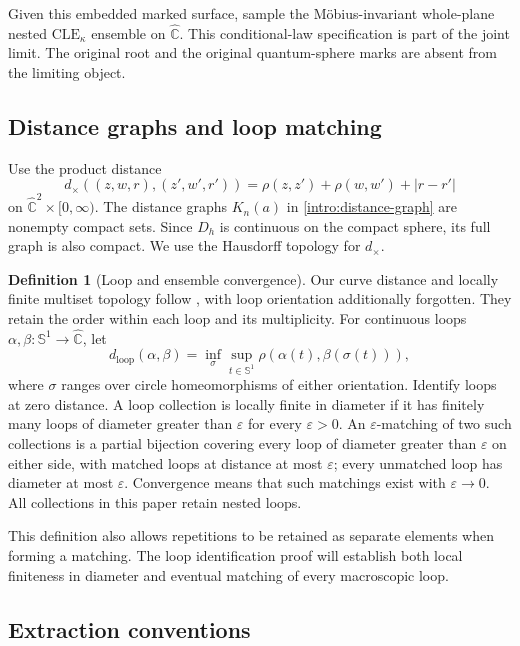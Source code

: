 \documentclass[11pt]{article}
\numberwithin{equation}{section}
\theoremstyle{definition}
\newtheorem{definition}[theorem]{Definition}
\theoremstyle{remark}
\newcommand{\1}{\mathbf 1}
\begin{document}
Given this embedded marked surface, sample the M\"obius-invariant
whole-plane nested $\mathrm{CLE}_{\kappa}$ ensemble on $\widehat{\mathbb C}$.
This conditional-law specification is part of the joint limit.
The original root and the original quantum-sphere marks are absent
from the limiting object.

\subsection{Distance graphs and loop matching}

Use the product distance
\[
 d_\times((z,w,r),(z',w',r'))
   =\rho(z,z')+\rho(w,w')+|r-r'|
\]
on $\widehat{\mathbb C}^2\times[0,\infty)$. The distance graphs
$K_n(a)$ in \eqref{intro:distance-graph} are nonempty compact sets.
Since $D_h$ is continuous on the compact sphere, its full graph is
also compact. We use the Hausdorff topology for $d_\times$.

\begin{definition}[Loop and ensemble convergence]
\label{intro:loop-topology}
Our curve distance and locally finite multiset topology follow
\citet[Section~2.2]{GwynneMillerQianCLE}, with loop orientation additionally
forgotten. They retain the order within each loop and its multiplicity.
For continuous loops $\alpha,\beta:\mathbb S^1\to\widehat{\mathbb C}$, let
\[
 d_{\mathrm{loop}}(\alpha,\beta)
 =\inf_{\sigma}\sup_{t\in\mathbb S^1}
       \rho(\alpha(t),\beta(\sigma(t))),
\]
where $\sigma$ ranges over circle homeomorphisms of either orientation.
Identify loops at zero distance. A loop collection is locally finite
in diameter if it has finitely many loops of diameter greater than
$\varepsilon$ for every $\varepsilon>0$.
An $\varepsilon$-matching of two such collections is a partial
bijection covering every loop of diameter greater than $\varepsilon$
on either side, with matched loops at distance at most $\varepsilon$;
every unmatched loop has diameter at most $\varepsilon$.
Convergence means that such matchings exist with
$\varepsilon\to0$. All collections in this paper retain nested loops.
\end{definition}

This definition also allows repetitions to be retained as separate
elements when forming a matching. The loop identification proof will
establish both local finiteness in diameter and eventual matching of
every macroscopic loop.

\subsection{Extraction conventions}
\end{document}
